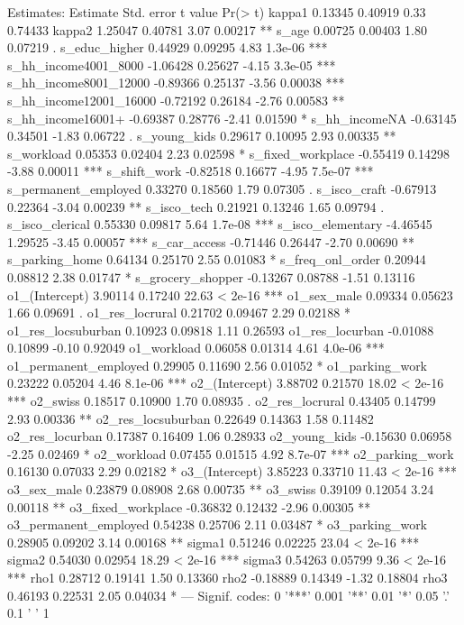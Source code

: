 \documentclass[%
    twoside, openright, titlepage, numbers=noenddot,%
    cleardoublepage=empty,%
    abstract=false,%
    BCOR=5.5mm, paper=a5, fontsize=10pt,%
]{scrreprt}
\begin{document}
\begin{Schunk}
\begin{Soutput}
Estimates:
                       Estimate Std. error t value Pr(> t)    
kappa1                  0.13345    0.40919    0.33 0.74433    
kappa2                  1.25047    0.40781    3.07 0.00217 ** 
s_age                   0.00725    0.00403    1.80 0.07219 .  
s_educ_higher           0.44929    0.09295    4.83 1.3e-06 ***
s_hh_income4001_8000   -1.06428    0.25627   -4.15 3.3e-05 ***
s_hh_income8001_12000  -0.89366    0.25137   -3.56 0.00038 ***
s_hh_income12001_16000 -0.72192    0.26184   -2.76 0.00583 ** 
s_hh_income16001+      -0.69387    0.28776   -2.41 0.01590 *  
s_hh_incomeNA          -0.63145    0.34501   -1.83 0.06722 .  
s_young_kids            0.29617    0.10095    2.93 0.00335 ** 
s_workload              0.05353    0.02404    2.23 0.02598 *  
s_fixed_workplace      -0.55419    0.14298   -3.88 0.00011 ***
s_shift_work           -0.82518    0.16677   -4.95 7.5e-07 ***
s_permanent_employed    0.33270    0.18560    1.79 0.07305 .  
s_isco_craft           -0.67913    0.22364   -3.04 0.00239 ** 
s_isco_tech             0.21921    0.13246    1.65 0.09794 .  
s_isco_clerical         0.55330    0.09817    5.64 1.7e-08 ***
s_isco_elementary      -4.46545    1.29525   -3.45 0.00057 ***
s_car_access           -0.71446    0.26447   -2.70 0.00690 ** 
s_parking_home          0.64134    0.25170    2.55 0.01083 *  
s_freq_onl_order        0.20944    0.08812    2.38 0.01747 *  
s_grocery_shopper      -0.13267    0.08788   -1.51 0.13116    
o1_(Intercept)          3.90114    0.17240   22.63 < 2e-16 ***
o1_sex_male             0.09334    0.05623    1.66 0.09691 .  
o1_res_locrural         0.21702    0.09467    2.29 0.02188 *  
o1_res_locsuburban      0.10923    0.09818    1.11 0.26593    
o1_res_locurban        -0.01088    0.10899   -0.10 0.92049    
o1_workload             0.06058    0.01314    4.61 4.0e-06 ***
o1_permanent_employed   0.29905    0.11690    2.56 0.01052 *  
o1_parking_work         0.23222    0.05204    4.46 8.1e-06 ***
o2_(Intercept)          3.88702    0.21570   18.02 < 2e-16 ***
o2_swiss                0.18517    0.10900    1.70 0.08935 .  
o2_res_locrural         0.43405    0.14799    2.93 0.00336 ** 
o2_res_locsuburban      0.22649    0.14363    1.58 0.11482    
o2_res_locurban         0.17387    0.16409    1.06 0.28933    
o2_young_kids          -0.15630    0.06958   -2.25 0.02469 *  
o2_workload             0.07455    0.01515    4.92 8.7e-07 ***
o2_parking_work         0.16130    0.07033    2.29 0.02182 *  
o3_(Intercept)          3.85223    0.33710   11.43 < 2e-16 ***
o3_sex_male             0.23879    0.08908    2.68 0.00735 ** 
o3_swiss                0.39109    0.12054    3.24 0.00118 ** 
o3_fixed_workplace     -0.36832    0.12432   -2.96 0.00305 ** 
o3_permanent_employed   0.54238    0.25706    2.11 0.03487 *  
o3_parking_work         0.28905    0.09202    3.14 0.00168 ** 
sigma1                  0.51246    0.02225   23.04 < 2e-16 ***
sigma2                  0.54030    0.02954   18.29 < 2e-16 ***
sigma3                  0.54263    0.05799    9.36 < 2e-16 ***
rho1                    0.28712    0.19141    1.50 0.13360    
rho2                   -0.18889    0.14349   -1.32 0.18804    
rho3                    0.46193    0.22531    2.05 0.04034 *  
---
Signif. codes:  0 '***' 0.001 '**' 0.01 '*' 0.05 '.' 0.1 ' ' 1


\end{Soutput}
\end{Schunk}
\end{document}
